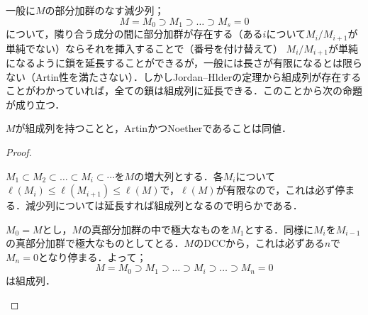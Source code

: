 一般に$M$の部分加群のなす減少列；
\[M=M_0\supset M_1\supset\dots\supset M_s=0\]
について，隣り合う成分の間に部分加群が存在する（ある$i$について$M_i/M_{i+1}$が単純でない）ならそれを挿入することで（番号を付け替えて）
$M_i/M_{i+1}$が単純になるように鎖を延長することができるが，一般には長さが有限になるとは限らない（Artin性を満たさない）．しかしJordan--Hlderの定理から組成列が存在することがわかっていれば，全ての鎖は組成列に延長できる．このことから次の命題が成り立つ．

\begin{prop}\label{prop:有限な組成列の同値条件}
	$M$が組成列を持つことと，ArtinかつNoetherであることは同値．
\end{prop}
\begin{proof}
	\begin{eqv}
		\item 
		$M_1\subset M_2\subset\dots\subset M_i\subset\cdots$を$M$の増大列とする．各$M_i$について$\ell(M_i)\leq\ell(M_{i+1})\leq\ell(M)$で，$\ell(M)$が有限なので，これは必ず停まる．減少列については延長すれば組成列となるので明らかである．
		\item 
		$M_0=M$とし，$M$の真部分加群の中で極大なものを$M_1$とする．同様に$M_i$を$M_{i-1}$の真部分加群で極大なものとしてとる．$M$のDCCから，これは必ずある$n$で$M_n=0$となり停まる．よって；
		\[M=M_0\supset M_1\supset\dots\supset M_i\supset\dots\supset M_n=0\]
		は組成列．
	\end{eqv}
\end{proof}

